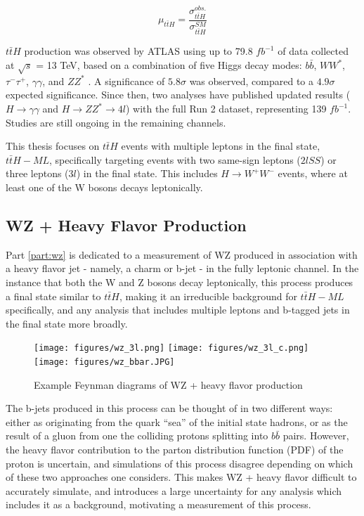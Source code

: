 \begin{equation}
        \mu_{t\bar{t}H} = \frac{\sigma^{obs.}_{t\bar{t}H}}{\sigma^{SM}_{t\bar{t}H}}
\end{equation}

$t\bar{t}H$ production was observed by ATLAS using up to 79.8 $fb^{-1}$ of data collected at $\sqrt{s}$ = 13 TeV, based on a combination of five Higgs decay modes: $b\bar{b}$, $WW^*$, $\tau^{-}\tau^{+}$, $\gamma\gamma$, and $ZZ^*$ \cite{Higgs_combo}. A significance of $5.8\sigma$ was observed, compared to a $4.9\sigma$ expected significance. Since then, two analyses have published updated results ($H\rightarrow \gamma\gamma$ and $H\rightarrow ZZ^*\rightarrow 4l$) with the full Run 2 dataset, representing 139 $fb^{-1}$. Studies are still ongoing in the remaining channels.

This thesis focuses on $t\bar{t}H$ events with multiple leptons in the final state, $t\bar{t}H-ML$, specifically targeting events with two same-sign leptons ($2lSS$) or three leptons ($3l$) in the final state. This includes $H \rightarrow W^+W^-$ events, where at least one of the W bosons decays leptonically.


\subsection{WZ + Heavy Flavor Production}
\label{sec:WZ_theory}

Part \ref{part:wz} is dedicated to a measurement of WZ produced in association with a heavy flavor jet - namely, a charm or b-jet - in the fully leptonic channel. In the instance that both the W and Z bosons decay leptonically, this process produces a final state similar to $t\bar{t}H$, making it an irreducible background for $t\bar{t}H-ML$ specifically, and any analysis that includes multiple leptons and b-tagged jets in the final state more broadly. 

\begin{figure}[H]
  \centering
  \texttt{[image: figures/wz\_3l.png]}%
  \texttt{[image: figures/wz\_3l\_c.png]}%
  \texttt{[image: figures/wz\_bbar.JPG]}
  \caption{Example Feynman diagrams of WZ + heavy flavor production}
  \label{fig:wz_feynman}
\end{figure}

The b-jets produced in this process can be thought of in two different ways: either as originating from the quark ``sea'' of the initial state hadrons, or as the result of a gluon from one the colliding protons splitting into $b\bar{b}$ pairs. However, the heavy flavor contribution to the parton distribution function (PDF) of the proton is uncertain, and simulations of this process disagree depending on which of these two approaches one considers. This makes WZ + heavy flavor difficult to accurately simulate, and introduces a large uncertainty for any analysis which includes it as a background, motivating a measurement of this process.

